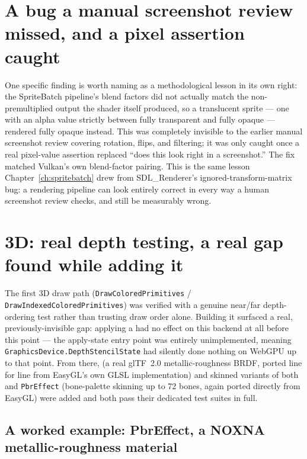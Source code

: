 \section{A bug a manual screenshot review missed, and a pixel assertion caught}

One specific finding is worth naming as a methodological lesson in its own right: the
SpriteBatch pipeline's blend factors did not actually match the non-premultiplied output the
shader itself produced, so a translucent sprite --- one with an alpha value strictly between
fully transparent and fully opaque --- rendered fully opaque instead. This was completely
invisible to the earlier manual screenshot review covering rotation, flips, and filtering; it
was only caught once a real pixel-value assertion replaced ``does this look right in a
screenshot.'' The fix matched Vulkan's own blend-factor pairing. This is the same lesson
Chapter~\ref{ch:spritebatch} drew from SDL\_Renderer's ignored-transform-matrix bug: a
rendering pipeline can look entirely correct in every way a human screenshot review checks,
and still be measurably wrong.

\section{3D: real depth testing, a real gap found while adding it}

The first 3D draw path (\texttt{DrawColoredPrimitives} / \texttt{DrawIndexedColoredPrimitives})
was verified with a genuine near/far depth-ordering test rather than trusting draw order
alone. Building it surfaced a real, previously-invisible gap: applying a
 had no effect on this backend at all before this point --- the
apply-state entry point was entirely unimplemented, meaning
\texttt{GraphicsDevice.DepthStencilState} had silently done nothing on WebGPU up to that
point. From there,  (a real glTF~2.0 metallic-roughness BRDF, ported line
for line from EasyGL's own GLSL implementation) and skinned variants of both
 and \texttt{PbrEffect} (bone-palette skinning up to 72 bones, again
ported directly from EasyGL) were added and both pass their dedicated test suites in full.

\subsection{A worked example: PbrEffect, a NOXNA metallic-roughness material}


